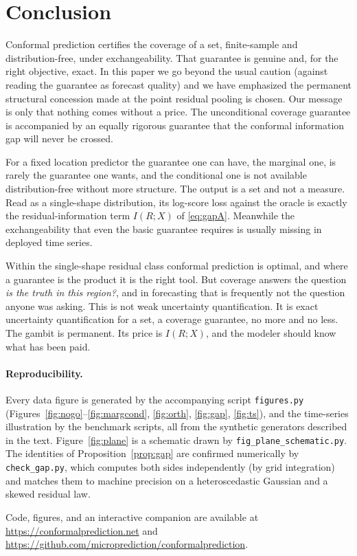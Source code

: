 \documentclass[11pt]{article}
\newif\ifanon\anonfalse
\theoremstyle{definition}
\begin{document}
\section{Conclusion}

Conformal prediction certifies the coverage of a set, finite-sample and distribution-free,
under exchangeability. That guarantee is genuine and, for the right objective, exact. In
this paper we go beyond the usual caution (against reading the guarantee as forecast
quality) and we have emphasized the permanent structural concession made at the point
residual pooling is chosen. Our message is only that nothing comes without a price. The
unconditional coverage guarantee is accompanied by an equally rigorous guarantee that the
conformal information gap will never be crossed.

For a fixed location predictor the guarantee one can have, the marginal one, is rarely the
guarantee one wants, and the conditional one is not available distribution-free without more
structure. The output is a set and not a measure. Read as a single-shape distribution, its
log-score loss against the oracle is exactly the residual-information term $I(R;X)$ of
\eqref{eq:gapA}. Meanwhile the exchangeability that even the basic guarantee requires is
usually missing in deployed time series.

Within the single-shape residual class conformal prediction is optimal, and where a
guarantee is the product it is the right tool. But coverage answers the question \emph{is
the truth in this region?}, and in forecasting that is frequently not the question anyone
was asking. This is not weak uncertainty quantification. It is exact uncertainty
quantification for a set, a coverage guarantee, no more and no less. The gambit is
permanent. Its price is $I(R;X)$, and the modeler should know what has been paid.

\paragraph{Reproducibility.} Every data figure is generated by the accompanying script
\texttt{figures.py} (Figures~\ref{fig:nogo}--\ref{fig:margcond}, \ref{fig:orth},
\ref{fig:gap}, \ref{fig:ts}), and the time-series illustration by the benchmark scripts, all
from the synthetic generators described in the text. Figure~\ref{fig:plane} is a schematic
drawn by \texttt{fig\_plane\_schematic.py}. The
identities of Proposition~\ref{prop:gap} are confirmed numerically by \texttt{check\_gap.py},
which computes both sides independently (by grid integration) and matches them to machine
precision on a heteroscedastic Gaussian and a skewed residual law.
\ifanon
Code, figures, and an interactive companion are provided as supplementary material. Public
URLs are omitted for anonymous review.
\else
Code, figures, and an interactive companion are available at
\url{https://conformalprediction.net} and
\url{https://github.com/microprediction/conformalprediction}.
\fi
\end{document}
